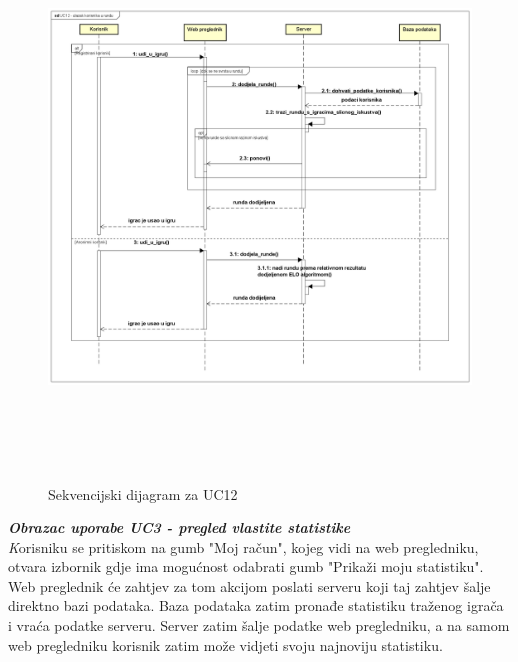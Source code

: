 				\begin{figure}[h]
					\centering
					\includegraphics[width=18.5cm,height=15cm]{sequenceDiagram}
					\caption{Sekvencijski dijagram za UC12}
					\label{fig:uc12}
				\end{figure}
				
				\newpage
				\textbf{\textit{Obrazac uporabe UC3 - pregled vlastite statistike}}\\
				\textit Korisniku se pritiskom na gumb "Moj račun", kojeg vidi na web pregledniku, otvara izbornik gdje ima mogućnost odabrati gumb "Prikaži moju statistiku". Web preglednik će zahtjev za tom akcijom poslati serveru koji taj zahtjev šalje direktno bazi podataka. Baza podataka zatim pronađe statistiku traženog igrača i vraća podatke serveru. Server zatim šalje podatke web pregledniku, a na samom web pregledniku korisnik zatim može vidjeti svoju najnoviju statistiku.\\
				
